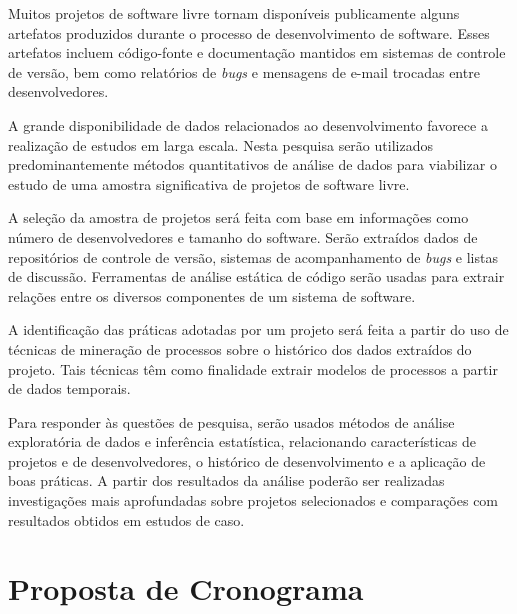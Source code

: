\documentclass{article}
\begin{document}
Muitos projetos de software livre tornam disponíveis publicamente alguns
artefatos produzidos durante o processo de desenvolvimento de software. Esses
artefatos incluem código-fonte e documentação mantidos em sistemas de controle
de versão, bem como relatórios de \emph{bugs} e mensagens de e-mail trocadas
entre desenvolvedores. 

A grande disponibilidade de dados relacionados ao desenvolvimento favorece a
realização de estudos em larga escala. Nesta pesquisa serão utilizados
predominantemente métodos quantitativos de análise de dados para viabilizar o
estudo de uma amostra significativa de projetos de software livre.

A seleção da amostra de projetos será feita com base em informações como número
de desenvolvedores e tamanho do software. Serão extraídos dados de repositórios
de controle de versão, sistemas de acompanhamento de \emph{bugs} e listas de
discussão.  Ferramentas de análise estática de código serão usadas para extrair
relações entre os diversos componentes de um sistema de software.


A identificação das práticas adotadas por um projeto será feita a partir do uso
de técnicas de mineração de processos \cite{rubin2007} sobre o histórico dos
dados extraídos do projeto. Tais técnicas têm como finalidade extrair modelos de
processos a partir de dados temporais.

Para responder às questões de pesquisa, serão usados métodos de análise
exploratória de dados e inferência estatística, relacionando características de
projetos e de desenvolvedores, o histórico de desenvolvimento e a aplicação de
boas práticas. A partir dos resultados da análise poderão ser realizadas
investigações mais aprofundadas sobre projetos selecionados e comparações com
resultados obtidos em estudos de caso.


\section{Proposta de Cronograma}
\end{document}
